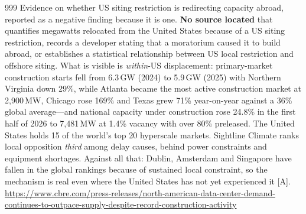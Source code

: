 \begin{thebibliography}{999}
 Evidence on whether US siting restriction is redirecting capacity abroad, reported as a negative finding because it is one. \textbf{No source located} that quantifies megawatts relocated from the United States because of a US siting restriction, records a developer stating that a moratorium caused it to build abroad, or establishes a statistical relationship between US local restriction and offshore siting. What is visible is \emph{within}-US displacement: primary-market construction starts fell from 6.3\,GW (2024) to 5.9\,GW (2025) with Northern Virginia down 29\%, while Atlanta became the most active construction market at 2,900\,MW, Chicago rose 169\% and Texas grew 71\% year-on-year against a 36\% global average---and national capacity under construction rose 24.8\% in the first half of 2026 to 7,481\,MW at 1.4\% vacancy with over 80\% preleased. The United States holds 15 of the world's top 20 hyperscale markets. Sightline Climate ranks local opposition \emph{third} among delay causes, behind power constraints and equipment shortages. Against all that: Dublin, Amsterdam and Singapore have fallen in the global rankings because of sustained local constraint, so the mechanism is real even where the United States has not yet experienced it [A]. \url{https://www.cbre.com/press-releases/north-american-data-center-demand-continues-to-outpace-supply-despite-record-construction-activity}


\end{thebibliography}

